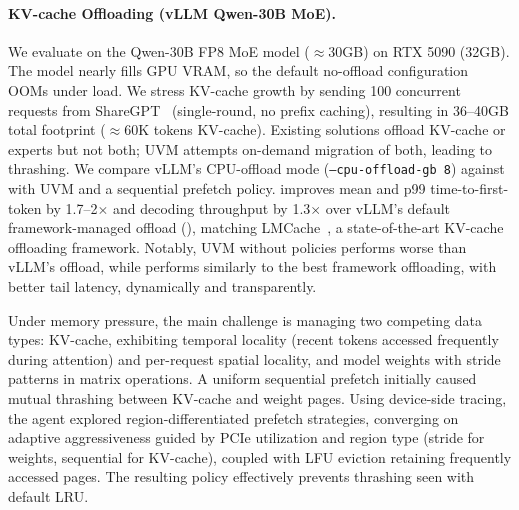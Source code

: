 \paragraph{KV-cache Offloading (vLLM Qwen-30B MoE).}
We evaluate \sys on the Qwen-30B FP8 MoE model ($\approx$30GB) on RTX 5090 (32GB).
The model nearly fills GPU VRAM, so the default no-offload configuration OOMs under load.
We stress KV-cache growth by sending 100 concurrent requests from ShareGPT~\cite{sharegpt} (single-round, no prefix caching), resulting in 36--40GB total footprint ($\approx$60K tokens KV-cache).
Existing solutions offload KV-cache or experts but not both; UVM attempts on-demand migration of both, leading to thrashing.
We compare vLLM's CPU-offload mode (\texttt{--cpu-offload-gb 8}) against \sys with UVM and a sequential prefetch policy.
\sys improves mean and p99 time-to-first-token by 1.7--2$\times$ and decoding throughput by 1.3$\times$ over vLLM's default framework-managed offload (), matching LMCache~\cite{lmcache}, a state-of-the-art KV-cache offloading framework.
Notably, UVM without \sys policies performs worse than vLLM's offload, while \sys performs similarly to the best framework offloading, with better tail latency, dynamically and transparently.

Under memory pressure, the main challenge is managing two competing data types: KV-cache, exhibiting temporal locality (recent tokens accessed frequently during attention) and per-request spatial locality, and model weights with stride patterns in matrix operations.
A uniform sequential prefetch initially caused mutual thrashing between KV-cache and weight pages.
Using device-side tracing, the agent explored region-differentiated prefetch strategies, converging on adaptive aggressiveness guided by PCIe utilization and region type (stride for weights, sequential for KV-cache), coupled with LFU eviction retaining frequently accessed pages.
The resulting policy effectively prevents thrashing seen with default LRU.

